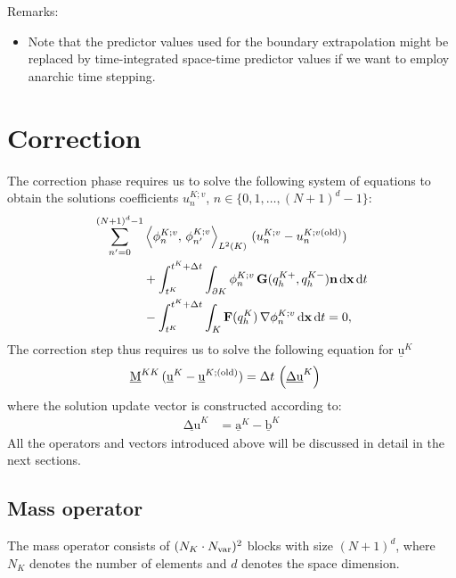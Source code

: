 \documentclass{scrreprt}
\newcommand{\partialup}{\partial}
\theoremstyle{definition}
\theoremstyle{nonumberplain}
\renewcommand{\vec}[1]{{\textbf{#1}}}
\newcommand{\laVec}[1]{\underline{\mathrm{#1}}}
\newcommand{\laMat}[1]{\underline{\mathrm{#1}}}
\newcommand{\cell}{K}
\newcommand{\Ncell}{{N_{\cell}}}
\newcommand{\cellBnd}{{\partialup\cell}}
\newcommand{\dt}{\textup{d}t}
\newcommand{\dV}{\text{d}\vec{x}}
\begin{document}
Remarks:
\begin{itemize}
  \item Note that the predictor values used for the boundary extrapolation might
  be replaced by time-integrated space-time predictor values if
  we want to employ anarchic time stepping.
\end{itemize}

\section{Correction}
The correction phase requires us to solve the following system
of equations
to obtain the solutions
coefficients
$u^{\cell;v}_{n}$,
$n\in\{0,1,\ldots,(N+1)^{d}-1\}$:
\begin{align}
\sum_{n'=0}^{(N+1)^d-1}
&\left\langle
\phi^{\cell;v}_{n},\,\phi^{\cell;v}_{n'}
\right\rangle
_{L^2(\cell)}
\,
(u^{\cell;v}_{n}-u^{\cell;v(\textup{old})}_{n})
\notag
\\
&+
\int_{t^\cell}^{t^\cell+\Delta t}
\int_\cellBnd
\phi^{\cell;v}_{n}\,\vec{G}(q^{\cell+}_h,q^{\cell-}_h)
\vec{n}\,
\dV\,\dt
\notag
\\
&-
\int_{t^\cell}^{t^\cell+\Delta t}
\int_\cell
\vec{F}(q^{\cell}_h)\,
\nabla \phi^{\cell;v}_{n}\,
\dV\,\dt  = 0,
\end{align}
The correction step thus requires us to solve the following
equation for $\laVec{u}^{\cell}$
\begin{align*}
\laMat{M}^{\cell\cell}\,
(\laVec{u}^{\cell} - \laVec{u}^{\cell;(\textup{old})})
&= \Delta t\,\left (
\laVec{\Delta u}^{\cell}
\right)
\end{align*}
where the solution update vector is constructed according to:
\begin{align*}
\laVec{\Delta u}^{\cell}
&=
\laVec{a}^{\cell}
-
\laVec{b}^{\cell}
\end{align*}
All the operators and vectors introduced above will be discussed
in detail in the next sections.
\subsection{Mass operator}
The mass operator consists  of ${(\Ncell\cdot N_\textup{var})^2}$ blocks with
size $(N+1)^d$, where $N_\cell$ denotes the number of elements and
$d$ denotes the space dimension.
\end{document}
